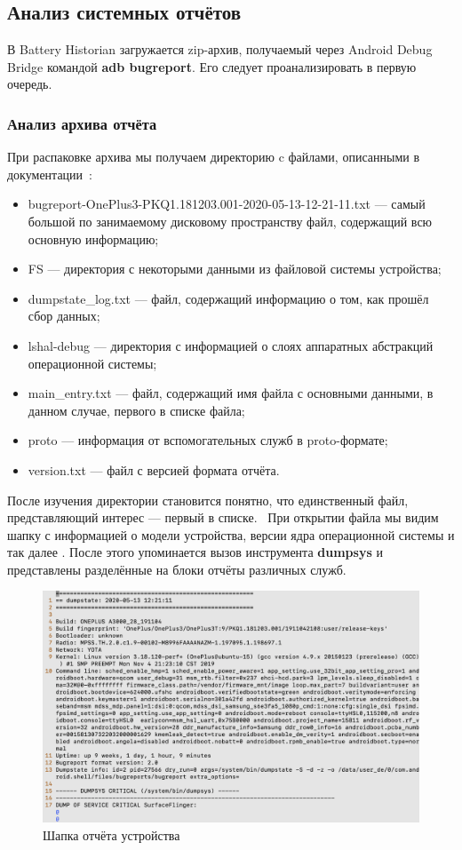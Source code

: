\documentclass[a4paper,14pt]{extarticle} %
\begin{document}
	\subsection{Анализ системных отчётов}
	
	В Battery Historian загружается zip-архив, получаемый через Android Debug Bridge командой \textbf{adb bugreport}. Его следует проанализировать в первую очередь.
	
	\subsubsection{Анализ архива отчёта}
	
	При распаковке архива мы получаем директорию c файлами, описанными в документации~\parencite{BugreportFormat}:
	\begin{itemize}
		\item bugreport-OnePlus3-PKQ1.181203.001-2020-05-13-12-21-11.txt --- самый большой по занимаемому дисковому пространству файл, содержащий всю основную информацию;
		\item FS --- директория с некоторыми данными из файловой системы устройства;
		\item dumpstate\_log.txt --- файл, содержащий информацию о том, как прошёл сбор данных;
		\item lshal-debug --- директория с информацией о слоях аппаратных абстракций операционной системы;
		\item main\_entry.txt --- файл, содержащий имя файла с основными данными, в данном случае, первого в списке файла;
		\item proto --- информация от вспомогательных служб в proto-формате;
		\item version.txt --- файл с версией формата отчёта.
	\end{itemize}

	После изучения директории становится понятно, что единственный файл, представляющий интерес --- первый в списке.  При открытии файла мы видим шапку с информацией о модели устройства, версии ядра операционной системы и так далее \ris{\ref{fig:report_header}}. После этого упоминается вызов инструмента \textbf{dumpsys} и представлены разделённые на блоки отчёты различных служб.
	
	\begin{figure}[!htb]
		\includegraphics[width=\textwidth]{report_header}
		\caption{Шапка отчёта устройства}
		\label{fig:report_header}
	\end{figure}
\end{document}
